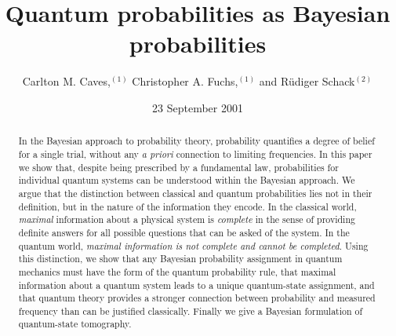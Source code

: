 

\draft



\draft

\title{\bf Quantum probabilities as Bayesian probabilities}

\author{Carlton M. Caves,$^{(1)}$\cite{Permaddress} Christopher A.
Fuchs,$^{(1)}$ and R\"udiger Schack$^{(2)}$\medskip}

\address{$^1$Bell Labs, Lucent Technologies, 600--700
Mountain Avenue, Murray Hill, New Jersey 07974, USA
\\
$^2$Department of Mathematics, Royal Holloway, University of London,
Egham, Surrey TW20$\;$0EX, United Kingdom
\\
\medskip
}

\date{23 September 2001}

\maketitle

\begin{abstract}
  In the Bayesian approach to probability theory, probability
  quantifies a degree of belief for a single trial, without any {\it
  a priori\/} connection to limiting frequencies.  In this
  paper we show that, despite being
  prescribed by a fundamental law, probabilities for individual
  quantum systems can be understood within the Bayesian approach.  We
  argue that the distinction between classical and quantum
  probabilities lies not in their definition, but in the nature of
  the information they encode. In the classical world, {\it
  maximal\/} information about a physical system is {\it complete\/}
  in the sense of providing definite answers for all possible
  questions that can be asked of the system.  In the quantum world,
  {\it maximal information is not complete and cannot be completed}.
  Using this distinction, we show that any Bayesian probability
  assignment in quantum mechanics must have the form of the quantum
  probability rule, that maximal information about a quantum system
  leads to a unique quantum-state assignment, and that quantum theory
  provides a stronger connection between probability and measured
  frequency than can be justified classically.  Finally we give a
  Bayesian formulation of quantum-state tomography.
\end{abstract}

